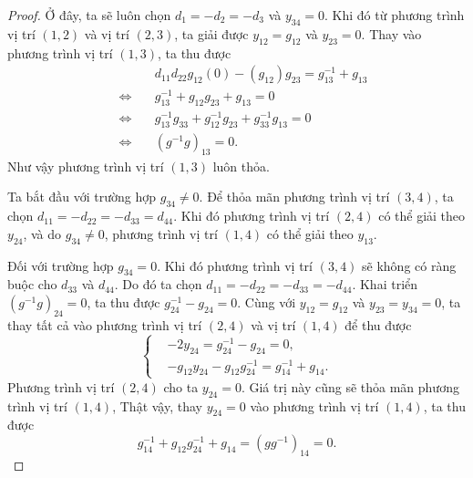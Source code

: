 \begin{proof}
    Ở đây, ta sẽ luôn chọn $d_1 = -d_2 = -d_3$ và $y_{34} = 0$. Khi đó từ phương trình vị trí $(1,2)$ và vị trí $(2,3)$, ta giải được $y_{12} = g_{12}$ và $y_{23} = 0$. Thay vào phương trình vị trí $(1,3)$, ta thu được
    \begin{align*}
        & d_{11} d_{22} g_{12} (0) - (g_{12})g_{23} = g_{13}^{-1} + g_{13} \\
        \quad\Longleftrightarrow\quad
        & g^{-1}_{13} + g_{12}g_{23} + g_{13} = 0 \\
        \quad\Longleftrightarrow\quad
        & g^{-1}_{13} g_{33} + g^{-1}_{12}g_{23} + g^{-1}_{33} g_{13} = 0 \\
        \quad\Longleftrightarrow\quad
        & (g^{-1}g)_{13} = 0. 
    \end{align*}
    Như vậy phương trình vị trí $(1,3)$ luôn thỏa. 
    
    Ta bắt đầu với trường hợp $g_{34} \neq 0$. Để thỏa mãn phương trình vị trí $(3,4)$, ta chọn $d_{11} = -d_{22} = -d_{33} = d_{44}$. Khi đó phương trình vị trí $(2,4)$ có thể giải theo $y_{24}$, và
    do $g_{34} \neq 0$, phương trình vị trí $(1,4)$ có thể giải theo $y_{13}$.
    
    Đối với trường hợp $g_{34} = 0$. Khi đó phương trình vị trí $(3,4)$ sẽ không có ràng buộc cho $d_{33}$ và $d_{44}$. Do đó ta chọn $d_{11} = -d_{22} = -d_{33} = -d_{44}$. Khai triển $(g^{-1}g)_{24} = 0$, ta thu được $g^{-1}_{24} - g_{24} = 0$. Cùng với $y_{12} = g_{12}$ và $y_{23} = y_{34} = 0$, ta thay tất cả vào phương trình vị trí $(2,4)$ và vị trí $(1,4)$ để thu được
    \[
        \left\{ \begin{aligned}
            & -2 y_{24} = g^{-1}_{24} - g_{24} = 0, \\
            & -g_{12} y_{24} - g_{12}g^{-1}_{24} = g^{-1}_{14} + g_{14}.
        \end{aligned} \right.
    \]
    Phương trình vị trí $(2,4)$ cho ta $y_{24} = 0$. Giá trị này cũng sẽ thỏa mãn phương trình vị trí $(1,4)$, Thật vậy, thay $y_{24} = 0$ vào phương trình vị trí $(1,4)$, ta thu được
    \[
        g^{-1}_{14} + g_{12}g^{-1}_{24} + g_{14} = (gg^{-1})_{14} = 0.
    \] 


\end{proof}
